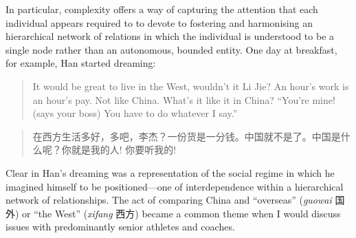\begin{CJK}{UTF8}{gbsn}
In particular, complexity offers a way of capturing the attention that each individual appears required to to devote to fostering and harmonising an hierarchical network of relations in which the individual is understood to be a single node rather than an autonomous, bounded entity.  One day at breakfast, for example, Han started dreaming:

    \begin{quote}
     It would be great to live in the West, wouldn’t it Li Jie?  An hour’s work is an hour’s pay.  Not like China.  What’s it like it in China? ``You’re mine! (says your boss) You have to do whatever I say.''
    \end{quote}
    \begin{quote}
     在西方生活多好，多吧，李杰？一份货是一分钱。中国就不是了。中国是什么呢？你就是我的人! 你要听我的!
    \end{quote}

Clear in Han's dreaming was a representation of the social regime in which he imagined himself to be positioned---one of interdependence within a hierarchical network of relationships.
The act of comparing China and ``overseas'' (\textit{guowai} 国外) or ``the West'' (\textit{xifang} 西方) became a common theme when I would discuss issues with predominantly senior athletes and coaches.




\end{CJK}
